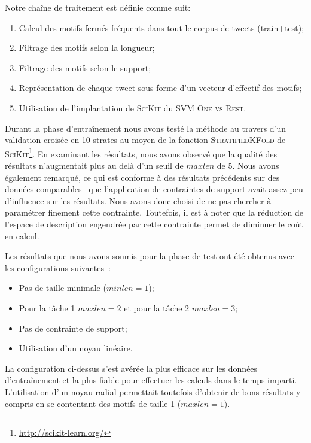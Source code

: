 Notre chaîne de traitement est définie comme suit:
\begin{enumerate}
  \item Calcul des motifs fermés fréquents dans tout le corpus de tweets (train+test);
  \item Filtrage des motifs selon la longueur;
  \item Filtrage des motifs selon le support;
  \item Représentation de chaque tweet sous forme d'un vecteur d'effectif des motifs;
  \item Utilisation de l'implantation de \textsc{SciKit} du SVM \textsc{One vs Rest}.
\end{enumerate}


Durant la phase d'entraînement nous avons testé la méthode au travers d'un validation croisée en 10 strates au moyen de la fonction \textsc{StratifiedKFold} de \textsc{SciKit}\footnote{\url{http://scikit-learn.org/}}.
 En examinant les résultats, nous avons observé que la qualité des résultats n'augmentait plus au delà d'un seuil de $maxlen$ de 5.
Nous avons également remarqué, ce qui est conforme à des résultats précédents sur des données comparables~\cite{Buscaldi-2017} que l'application de contraintes de support avait assez peu d'influence sur les résultats.
Nous avons donc choisi de ne pas chercher à paramétrer finement cette contrainte.
Toutefois, il est à noter que la réduction de l'espace de description engendrée par cette contrainte permet de diminuer le coût en calcul.

Les résultats que nous avons soumis pour la phase de test ont été obtenus avec les configurations suivantes~:
\begin{itemize}
  \item Pas de taille minimale ($minlen=1$);
  \item Pour la tâche 1 $maxlen=2$ et pour la tâche 2 $maxlen=3$;
  \item Pas de contrainte de support;
  \item Utilisation d'un noyau linéaire.
\end{itemize}

La configuration ci-dessus s'est avérée la plus efficace sur les données d'entraînement et la plus fiable pour effectuer les calculs dans le temps imparti.
L'utilisation d'un noyau radial permettait toutefois d'obtenir de bons résultats y compris en se contentant des motifs de taille 1 ($maxlen=1$).



